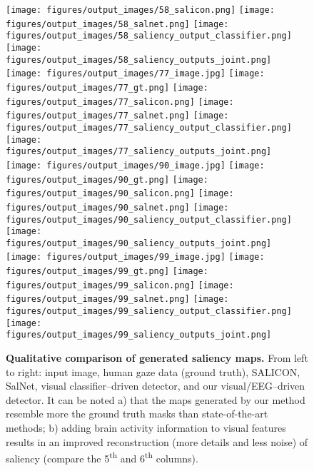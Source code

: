 \documentclass[10pt,journal,compsoc,twocolumn]{IEEEtran}
\begin{document}
\begin{figure*}
\texttt{[image: figures/output\_images/58\_salicon.png]}
\texttt{[image: figures/output\_images/58\_salnet.png]}
\texttt{[image: figures/output\_images/58\_saliency\_output\_classifier.png]}
\texttt{[image: figures/output\_images/58\_saliency\_outputs\_joint.png]}
\vspace{0.5em}\\
\texttt{[image: figures/output\_images/77\_image.jpg]}
\texttt{[image: figures/output\_images/77\_gt.png]}
\texttt{[image: figures/output\_images/77\_salicon.png]}
\texttt{[image: figures/output\_images/77\_salnet.png]}
\texttt{[image: figures/output\_images/77\_saliency\_output\_classifier.png]}
\texttt{[image: figures/output\_images/77\_saliency\_outputs\_joint.png]}
\vspace{0.5em}\\
\texttt{[image: figures/output\_images/90\_image.jpg]}
\texttt{[image: figures/output\_images/90\_gt.png]}
\texttt{[image: figures/output\_images/90\_salicon.png]}
\texttt{[image: figures/output\_images/90\_salnet.png]}
\texttt{[image: figures/output\_images/90\_saliency\_output\_classifier.png]}
\texttt{[image: figures/output\_images/90\_saliency\_outputs\_joint.png]}
\vspace{0.5em}\\
\texttt{[image: figures/output\_images/99\_image.jpg]}
\texttt{[image: figures/output\_images/99\_gt.png]}
\texttt{[image: figures/output\_images/99\_salicon.png]}
\texttt{[image: figures/output\_images/99\_salnet.png]}
\texttt{[image: figures/output\_images/99\_saliency\_output\_classifier.png]}
\texttt{[image: figures/output\_images/99\_saliency\_outputs\_joint.png]}
\vspace{0.5em}\\
\caption{\textbf{Qualitative comparison of generated saliency maps.} From left to right: input image, human gaze data (ground truth), SALICON, SalNet, visual classifier--driven detector, and our visual/EEG--driven detector. It can be noted a) that the maps generated by our method resemble more the ground truth masks than state-of-the-art methods;  b) adding brain activity information to visual features results in an improved reconstruction (more details and less noise) of saliency (compare the 5\textsuperscript{th} and 6\textsuperscript{th} columns).}
\label{fig:saliency_results}
\end{figure*}
\end{document}
